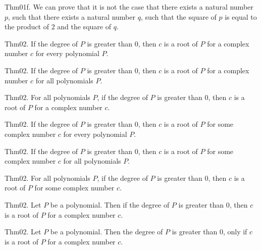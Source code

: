 \documentclass{article}
\begin{document}
Thm01f. We can prove that it is not the case that there exists a natural number $p$, such that there exists a natural number $q$, such that the square of $p$ is equal to the product of $2$ and the square of $q$.

Thm02. If the degree of $P$ is greater than $0$, then $c$ is a root of $P$ for a complex number $c$ for every polynomial $P$.

Thm02. If the degree of $P$ is greater than $0$, then $c$ is a root of $P$ for a complex number $c$ for all polynomials $P$.

Thm02. For all polynomials $P$, if the degree of $P$ is greater than $0$, then $c$ is a root of $P$ for a complex number $c$.

Thm02. If the degree of $P$ is greater than $0$, then $c$ is a root of $P$ for some complex number $c$ for every polynomial $P$.

Thm02. If the degree of $P$ is greater than $0$, then $c$ is a root of $P$ for some complex number $c$ for all polynomials $P$.

Thm02. For all polynomials $P$, if the degree of $P$ is greater than $0$, then $c$ is a root of $P$ for some complex number $c$.

Thm02. Let $P$ be a polynomial. Then if the degree of $P$ is greater than $0$, then $c$ is a root of $P$ for a complex number $c$.

Thm02. Let $P$ be a polynomial. Then the degree of $P$ is greater than $0$, only if $c$ is a root of $P$ for a complex number $c$.
\end{document}
